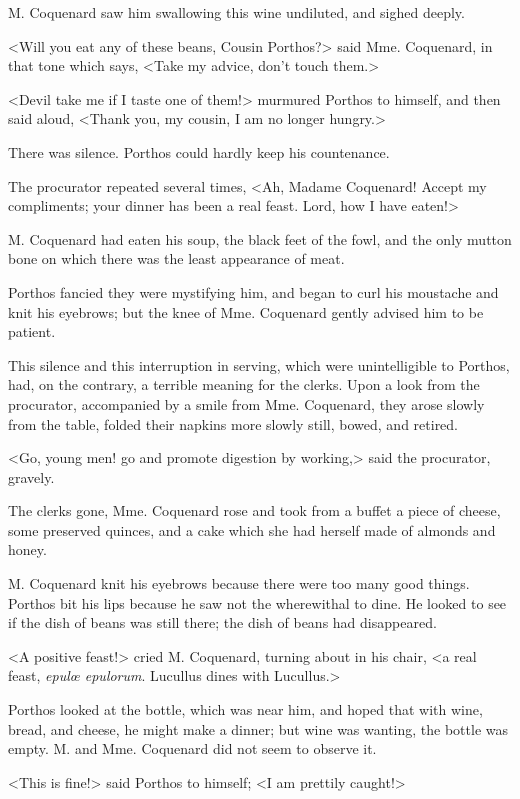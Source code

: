 M. Coquenard saw him swallowing this wine undiluted, and sighed deeply. 

<Will you eat any of these beans, Cousin Porthos?> said Mme. Coquenard, in that tone which says, <Take my advice, don't touch them.> 

<Devil take me if I taste one of them!> murmured Porthos to himself, and then said aloud, <Thank you, my cousin, I am no longer hungry.> 

There was silence. Porthos could hardly keep his countenance. 

The procurator repeated several times, <Ah, Madame Coquenard! Accept my compliments; your dinner has been a real feast. Lord, how I have eaten!> 

M. Coquenard had eaten his soup, the black feet of the fowl, and the only mutton bone on which there was the least appearance of meat. 

Porthos fancied they were mystifying him, and began to curl his moustache and knit his eyebrows; but the knee of Mme. Coquenard gently advised him to be patient. 

This silence and this interruption in serving, which were unintelligible to Porthos, had, on the contrary, a terrible meaning for the clerks. Upon a look from the procurator, accompanied by a smile from Mme. Coquenard, they arose slowly from the table, folded their napkins more slowly still, bowed, and retired. 

<Go, young men! go and promote digestion by working,> said the procurator, gravely. 

The clerks gone, Mme. Coquenard rose and took from a buffet a piece of cheese, some preserved quinces, and a cake which she had herself made of almonds and honey. 

M. Coquenard knit his eyebrows because there were too many good things. Porthos bit his lips because he saw not the wherewithal to dine. He looked to see if the dish of beans was still there; the dish of beans had disappeared. 

<A positive feast!> cried M. Coquenard, turning about in his chair, <a real feast, \textit{epulœ epulorum}. Lucullus dines with Lucullus.> 

Porthos looked at the bottle, which was near him, and hoped that with wine, bread, and cheese, he might make a dinner; but wine was wanting, the bottle was empty. M. and Mme. Coquenard did not seem to observe it. 

<This is fine!> said Porthos to himself; <I am prettily caught!> 

